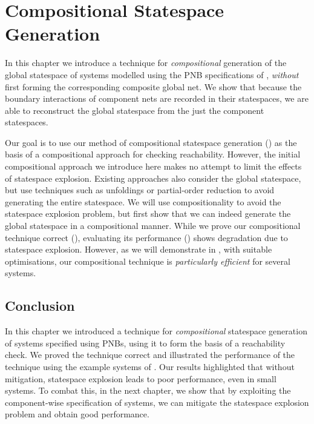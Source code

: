 \chapter{Compositional Statespace Generation}\label{chp:compChecking}

In this chapter we introduce a technique for \emph{compositional} generation of
the global statespace of systems modelled using the PNB specifications of
, \emph{without} first forming the corresponding
composite global net. We show that because the boundary interactions of
component nets are recorded in their statespaces, we are able to reconstruct
the global statespace from the just the component statespaces.

Our goal is to use our method of compositional statespace generation
() as the basis of a compositional approach for
checking reachability. However, the initial compositional approach we introduce
here makes no attempt to limit the effects of statespace explosion. Existing
approaches also consider the global statespace, but use techniques such as
unfoldings or partial-order reduction to avoid generating the entire
statespace. We will use compositionality to avoid the statespace explosion
problem, but first show that we can indeed generate the global statespace in a
compositional manner. While we prove our compositional technique correct
(), evaluating its performance ()
shows degradation due to statespace explosion. However, as we will demonstrate
in , with suitable optimisations, our
compositional technique is \emph{particularly efficient} for several systems.

{}

{}

{}

\section{Conclusion}

In this chapter we introduced a technique for \emph{compositional} statespace
generation of systems specified using PNBs, using it to form the basis of
a reachability check. We proved the technique correct and illustrated the
performance of the technique using the example systems of
. Our results highlighted that without
mitigation, statespace explosion leads to poor performance, even in small
systems. To combat this, in the next chapter, we show that by exploiting
the component-wise specification of systems, we can mitigate the statespace
explosion problem and obtain good performance.
